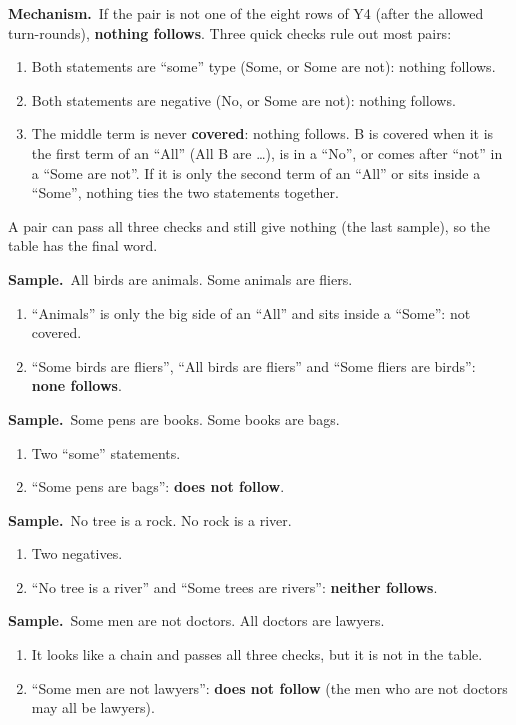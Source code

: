 \documentclass[11pt,a4paper]{article}
\newcommand{\mech}{\textbf{\color{ember}Mechanism.}\ }
\newif\ifkeepsamp
\newcommand{\samp}{\ifkeepsamp\needspace{4\baselineskip}\fi\textbf{\color{ember}Sample.}\ }
\begin{document}
\mech If the pair is not one of the eight rows of Y4 (after the allowed turn-rounds), \textbf{nothing follows}. Three quick checks rule out most pairs:
\begin{enumerate}
\item Both statements are ``some'' type (Some, or Some are not): nothing follows.
\item Both statements are negative (No, or Some are not): nothing follows.
\item The middle term is never \textbf{covered}: nothing follows. B is covered when it is the first term of an ``All'' (All B are \dots), is in a ``No'', or comes after ``not'' in a ``Some are not''. If it is only the second term of an ``All'' or sits inside a ``Some'', nothing ties the two statements together.
\end{enumerate}
A pair can pass all three checks and still give nothing (the last sample), so the table has the final word.

\samp All birds are animals. Some animals are fliers.
\begin{enumerate}
\item ``Animals'' is only the big side of an ``All'' and sits inside a ``Some'': not covered.
\item ``Some birds are fliers'', ``All birds are fliers'' and ``Some fliers are birds'': \textbf{none follows}.
\end{enumerate}
\samp Some pens are books. Some books are bags.
\begin{enumerate}
\item Two ``some'' statements.
\item ``Some pens are bags'': \textbf{does not follow}.
\end{enumerate}
\samp No tree is a rock. No rock is a river.
\begin{enumerate}
\item Two negatives.
\item ``No tree is a river'' and ``Some trees are rivers'': \textbf{neither follows}.
\end{enumerate}
\samp Some men are not doctors. All doctors are lawyers.
\begin{enumerate}
\item It looks like a chain and passes all three checks, but it is not in the table.
\item ``Some men are not lawyers'': \textbf{does not follow} (the men who are not doctors may all be lawyers).
\end{enumerate}
\end{document}
